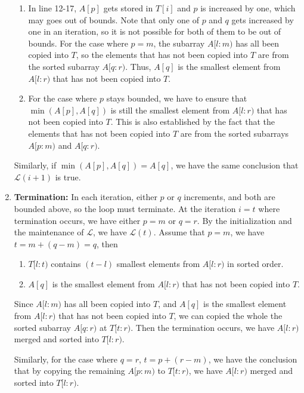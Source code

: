 \documentclass[12pt]{article}
\begin{document}
\begin{enumerate}
\begin{enumerate}
        \item In line 12-17, \(A[p]\) gets stored in \(T[i]\) and \(p\) is increased by one, which may goes out of bounds. Note that only one of \(p\) and \(q\) gets increased by one in an iteration, so it is not possible for both of them to be out of bounds. For the case where \(p = m\), the subarray \(A[l : m)\) has all been copied into \(T\), so the elements that has not been copied into \(T\) are from the sorted subarray \(A[q : r)\). Thus, \(A[q]\) is the smallest element from \(A[l : r)\) that has not been copied into \(T\).

        \item For the case where \(p\) stays bounded, we have to ensure that \(\min(A[p], A[q])\) is still the smallest element from \(A[l : r)\) that has not been copied into \(T\). This is also established by the fact that the elements that has not been copied into \(T\) are from the sorted subarrays \(A[p : m)\) and \(A[q : r)\).
    \end{enumerate}

    Similarly, if \(\min(A[p], A[q]) = A[q]\), we have the same conclusion that \(\mathcal{L}(i+1)\) is true.

    \item \textbf{Termination:} In each iteration, either \(p\) or \(q\) increments, and both are bounded above, so the loop must terminate. At the iteration \(i = t\) where termination occurs, we have either \(p = m\) or \(q = r\). By the initialization and the maintenance of \(\mathcal{L}\), we have \(\mathcal{L}(t)\). Assume that \(p = m\), we have \(t = m + (q - m) = q\), then 
    \begin{enumerate}
        \item \(T[l : t)\) contains \((t - l)\) smallest elements from \(A[l : r)\) in sorted order.
        \item \(A[q]\) is the smallest element from \(A[l : r)\) that has not been copied into \(T\).
    \end{enumerate}

    Since \(A[l : m)\) has all been copied into \(T\), and \(A[q]\) is the smallest element from \(A[l : r)\) that has not been copied into \(T\), we can copied the whole the sorted subarray \(A[q : r)\) at \(T[t : r)\). Then the termination occurs, we have \(A[l : r)\) merged and sorted into \(T[l : r)\).

    Similarly, for the case where \(q = r\), \(t = p + (r - m)\), we have the conclusion that by copying the remaining \(A[p : m)\) to \(T[t : r)\), we have \(A[l : r)\) merged and sorted into \(T[l : r)\).
\end{enumerate}
\end{document}
